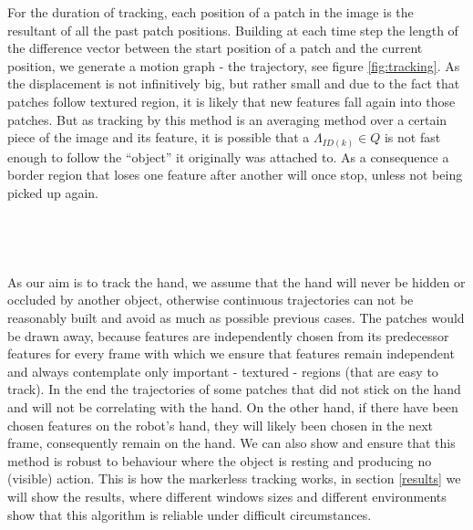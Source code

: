 For the duration of tracking, each position of a patch in the image is the resultant of all the past patch positions. Building at each time step the length of the difference vector between the start position of a patch and the current position, we generate a motion graph - the trajectory, see figure \ref{fig:tracking}. %
As the displacement is not infinitively big, but rather small and due to the fact that patches follow textured region, it is likely that new features fall again into those patches. But as tracking by this method is an averaging method over a certain piece of the image and its feature, it is possible that a $\Lambda_{ID\left( k \right) } \in Q$ is not fast enough to follow the ``object'' it originally was attached to. As a consequence a border region that loses one feature after another will once stop, unless not being picked up again. \\ \\ \\ \\ \\ 

As our aim is to track the hand, we assume that the hand will never be hidden or occluded by another object, otherwise continuous trajectories can not be reasonably built and avoid as much as possible previous cases.  The patches would be drawn away, because features are independently chosen from its predecessor features for every frame with which we ensure that features remain independent and always contemplate only important - textured - regions (that are easy to track). In the end the trajectories of some patches that did not stick on the hand and will not be correlating with the hand. On the other hand, if there have been chosen features on the robot's hand, they will likely been chosen in the next frame, consequently remain on the hand. We can also show and ensure that this method is robust to behaviour where the object is resting and producing no (visible) action. This is how the markerless tracking works, in section \ref{results} we will show the results, where different windows sizes and different environments show that this algorithm is reliable under difficult circumstances. 

